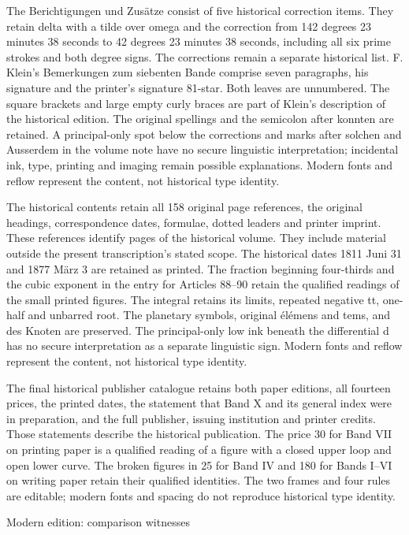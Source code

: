 The Berichtigungen und Zusätze consist of five historical correction items. They retain delta with a tilde over omega and the correction from 142 degrees 23 minutes 38 seconds to 42 degrees 23 minutes 38 seconds, including all six prime strokes and both degree signs. The corrections remain a separate historical list. F. Klein’s Bemerkungen zum siebenten Bande comprise seven paragraphs, his signature and the printer’s signature 81-star. Both leaves are unnumbered. The square brackets and large empty curly braces are part of Klein’s description of the historical edition. The original spellings and the semicolon after konnten are retained. A principal-only spot below the corrections and marks after solchen and Ausserdem in the volume note have no secure linguistic interpretation; incidental ink, type, printing and imaging remain possible explanations. Modern fonts and reflow represent the content, not historical type identity.

The historical contents retain all 158 original page references, the original headings, correspondence dates, formulae, dotted leaders and printer imprint. These references identify pages of the historical volume. They include material outside the present transcription’s stated scope. The historical dates 1811 Juni 31 and 1877 März 3 are retained as printed. The fraction beginning four-thirds and the cubic exponent in the entry for Articles 88–90 retain the qualified readings of the small printed figures. The integral retains its limits, repeated negative tt, one-half and unbarred root. The planetary symbols, original élémens and tems, and des Knoten are preserved. The principal-only low ink beneath the differential d has no secure interpretation as a separate linguistic sign. Modern fonts and reflow represent the content, not historical type identity.

The final historical publisher catalogue retains both paper editions, all fourteen prices, the printed dates, the statement that Band X and its general index were in preparation, and the full publisher, issuing institution and printer credits. Those statements describe the historical publication. The price 30 for Band VII on printing paper is a qualified reading of a figure with a closed upper loop and open lower curve. The broken figures in 25 for Band IV and 180 for Bands I--VI on writing paper retain their qualified identities. The two frames and four rules are editable; modern fonts and spacing do not reproduce historical type identity.

\par\medskip
{\large Modern edition: comparison witnesses\par}\nopagebreak[4]

